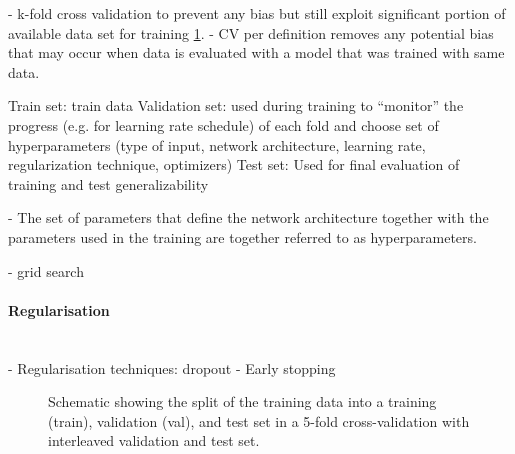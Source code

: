 - k-fold cross validation to prevent any bias but still exploit significant portion of available data set for training \cref{fig:k-fold-method}.
- CV per definition removes any potential bias that may occur when data is evaluated with a model that was trained with same data.

Train set: train data
Validation set: used during training to ``monitor'' the progress (e.g. for learning rate schedule) of each fold and choose set of hyperparameters (type of input, network architecture, learning rate, regularization technique, optimizers)
Test set: Used for final evaluation of training and test generalizability

- The set of parameters that define the network architecture together with the parameters used in the training are together referred to as hyperparameters.

- grid search

\paragraph{Regularisation}\mbox{}\\

- Regularisation techniques: dropout
- Early stopping


\begin{figure}[t]
    \caption{Schematic showing the split of the training data into a training (train), validation (val), and test set in a 5-fold cross-validation with interleaved validation and test set.}
    \label{fig:k-fold-method}
\end{figure}
